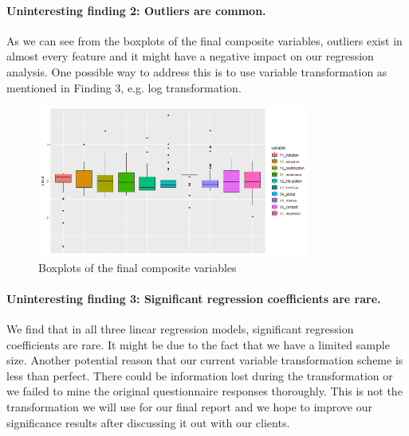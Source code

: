\documentclass[12pt, letterpaper]{article}
\begin{document}
\paragraph{Uninteresting finding 2: Outliers are common.} 
As we can see from the boxplots of the final composite variables, outliers exist in almost every feature and it might have a negative impact on our regression analysis. One possible way to address this is to use variable transformation as mentioned in Finding 3, e.g. log transformation. 
\begin{figure}[H]
\centering
\includegraphics[width=0.8\textwidth]{boxplot}
\caption{Boxplots of the final composite variables}
\end{figure}
\paragraph{Uninteresting finding 3: Significant regression coefficients are rare.} 
We find that in all three linear regression models, significant regression coefficients are rare. It might be due to the fact that we have a limited sample size. Another potential reason that our current variable transformation scheme is less than perfect. There could be information lost during the transformation or we failed to mine the original questionnaire responses thoroughly. This is not the transformation we will use for our final report and we hope to improve our significance results after discussing it out with our clients.
\end{document}
